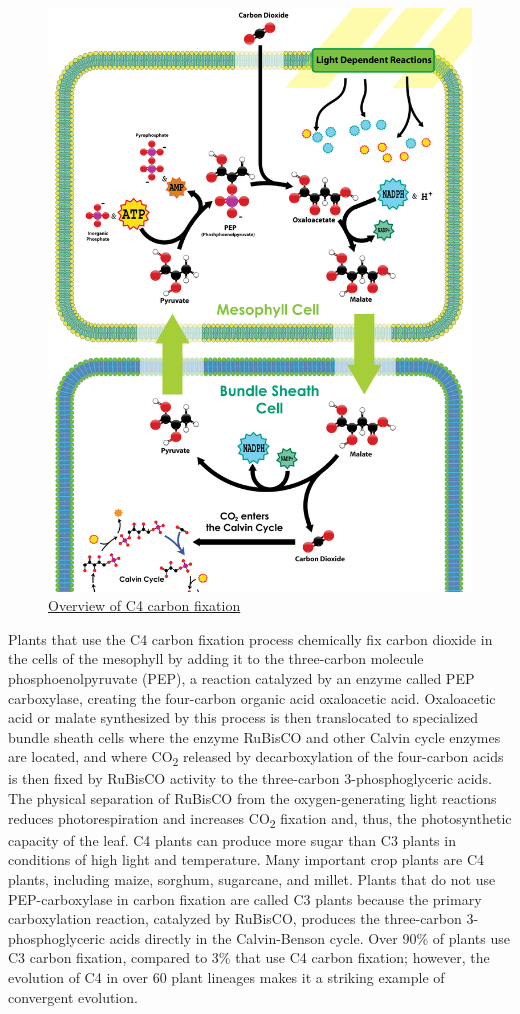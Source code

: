 \begin{figure}

{\centering \includegraphics[width=0.7\linewidth]{./figures/photosynthesis/HatchSlackpathway2} 

}

\caption{\href{https://commons.wikimedia.org/wiki/File:HatchSlackpathway2.svg}{Overview of C4 carbon fixation}}\label{fig:c4carbon}
\end{figure}

Plants that use the C4 carbon fixation process chemically fix carbon dioxide in the cells of the mesophyll by adding it to the three-carbon molecule phosphoenolpyruvate (PEP), a reaction catalyzed by an enzyme called PEP carboxylase, creating the four-carbon organic acid oxaloacetic acid. Oxaloacetic acid or malate synthesized by this process is then translocated to specialized bundle sheath cells where the enzyme RuBisCO and other Calvin cycle enzymes are located, and where CO\textsubscript{2} released by decarboxylation of the four-carbon acids is then fixed by RuBisCO activity to the three-carbon 3-phosphoglyceric acids. The physical separation of RuBisCO from the oxygen-generating light reactions reduces photorespiration and increases CO\textsubscript{2} fixation and, thus, the photosynthetic capacity of the leaf. C4 plants can produce more sugar than C3 plants in conditions of high light and temperature. Many important crop plants are C4 plants, including maize, sorghum, sugarcane, and millet. Plants that do not use PEP-carboxylase in carbon fixation are called C3 plants because the primary carboxylation reaction, catalyzed by RuBisCO, produces the three-carbon 3-phosphoglyceric acids directly in the Calvin-Benson cycle. Over 90\% of plants use C3 carbon fixation, compared to 3\% that use C4 carbon fixation; however, the evolution of C4 in over 60 plant lineages makes it a striking example of convergent evolution.

